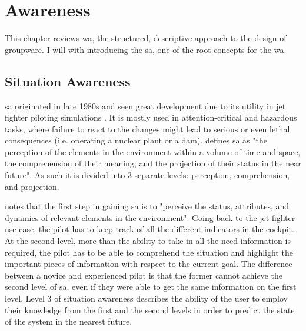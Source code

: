 
\chapter{Awareness}

This chapter reviews \gls{wa}, the structured, descriptive approach to the design of groupware. I will with introducing the \gls{sa}, one of the root concepts for the \gls{wa}.

\section{Situation Awareness}


\gls{sa} originated in late 1980s and seen great development  due to its utility in jet fighter piloting simulations \parencite{endsley_situation_1988}. It is mostly used in attention-critical and hazardous tasks, where failure to react to the changes might lead to serious or even lethal consequences (i.e. operating a nuclear plant or a dam).
\parencite{endsley_design_1988} defines \gls{sa} as "the perception of the elements in the environment within a volume of time and space, the comprehension of their meaning, and the projection of their status in the near future". As such it is divided into 3 separate levels: perception, comprehension, and projection.

\parencite{endsley_situation_inbook} notes that the first step in gaining \gls{sa} is to "perceive the status, attributes, and dynamics of relevant elements in the environment". Going back to the jet fighter use case, the pilot has to keep track of all the different indicators in the cockpit. At the second level, more than the ability to take in all the need information is required, the pilot has to be able to comprehend the situation and highlight the important pieces of information with respect to the current goal. The difference between a novice and experienced pilot is that the former cannot achieve the second level of \gls{sa}, even if they were able to get the same information on the first level. Level 3 of situation awareness describes the ability of the user to employ their knowledge from the first and the second levels in order to predict the state of the system in the nearest future.


